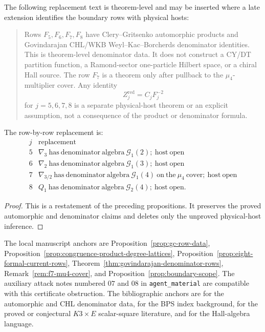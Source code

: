\begin{theorem}
The following replacement text is theorem-level and may be inserted
where a late extension identifies the boundary rows with physical hosts:

\begin{quote}
Rows \(F_5,F_6,F_7,F_8\) have Clery--Gritsenko automorphic products and
Govindarajan CHL/WKB Weyl--Kac--Borcherds denominator identities.  This
is theorem-level denominator data.  It does not construct a CY/DT
partition function, a Ramond-sector one-particle Hilbert space, or a
chiral Hall source.  The row \(F_7\) is a theorem only after pullback to
the \(\mu_4\)-multiplier cover.  Any identity
\[
Z_j^{\mathrm{red}}=C_jF_j^{-2}
\]
for \(j=5,6,7,8\) is a separate physical-host theorem or an explicit
assumption, not a consequence of the product or denominator formula.
\end{quote}

The row-by-row replacement is:
\[
\begin{array}{c|c}
j&\mathrm{replacement}\\ \hline
5&\nabla_3\ \mathrm{has\ denominator\ algebra}\ \mathcal G_1(2);
\ \mathrm{host\ open}\\
6&\nabla_2\ \mathrm{has\ denominator\ algebra}\ \mathcal G_1(3);
\ \mathrm{host\ open}\\
7&\nabla_{3/2}\ \mathrm{has\ denominator\ algebra}\ \mathcal G_1(4)
\ \mathrm{on\ the}\ \mu_4\mathrm{\ cover};\ \mathrm{host\ open}\\
8&Q_1\ \mathrm{has\ denominator\ algebra}\ \mathcal G_2(4);
\ \mathrm{host\ open}.
\end{array}
\]
\end{theorem}

\begin{proof}
This is a restatement of the preceding propositions.  It preserves the
proved automorphic and denominator claims and deletes only the unproved
physical-host inference.
\end{proof}

\begin{remark}
The local manuscript anchors are
Proposition~\ref{prop:gc-row-data},
Proposition~\ref{prop:congruence-product-degree-lattices},
Proposition~\ref{prop:eight-formal-current-rows},
Theorem~\ref{thm:govindarajan-denominator-rows},
Remark~\ref{rem:f7-mu4-cover}, and
Proposition~\ref{prop:boundary-scope}.  The auxiliary attack notes
numbered \(07\) and \(08\) in \texttt{agent\_material} are compatible
with this certificate obstruction.  The bibliographic
anchors are \cite{GC,CD09BKM,GK09CHL,GK10Composite,Gov11BKM} for the
automorphic and CHL denominator data, \cite{DMVV,DVV,HM} for the BPS
index background, \cite{OB,OPand,BRYAN} for the proved or conjectural
\(K3\times E\) scalar-square literature, and
\cite{KSCoHA,DavisonMeinhardtCoHA} for the Hall-algebra language.
\end{remark}
